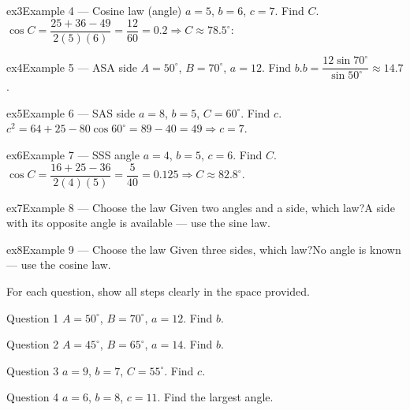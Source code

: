 \documentclass[11pt]{article}
\begin{document}
\begin{example}{ex3}{Example 4 --- Cosine law (angle)}
$a=5$, $b=6$, $c=7$. Find $C$.\soln $\cos C=\dfrac{25+36-49}{2(5)(6)}=\dfrac{12}{60}=0.2\Rightarrow C\approx78.5^\circ$:
\end{example}

\begin{example}{ex4}{Example 5 --- ASA side}
$A=50^\circ$, $B=70^\circ$, $a=12$. Find $b$.\soln $b=\dfrac{12\sin70^\circ}{\sin50^\circ}\approx14.7$.
\end{example}

\begin{example}{ex5}{Example 6 --- SAS side}
$a=8$, $b=5$, $C=60^\circ$. Find $c$.\soln $c^2=64+25-80\cos60^\circ=89-40=49\Rightarrow c=7$.
\end{example}

\begin{example}{ex6}{Example 7 --- SSS angle}
$a=4$, $b=5$, $c=6$. Find $C$.\soln $\cos C=\dfrac{16+25-36}{2(4)(5)}=\dfrac{5}{40}=0.125\Rightarrow C\approx82.8^\circ$.
\end{example}

\begin{example}{ex7}{Example 8 --- Choose the law}
Given two angles and a side, which law?\soln A side with its opposite angle is available — use the sine law.
\end{example}

\begin{example}{ex8}{Example 9 --- Choose the law}
Given three sides, which law?\soln No angle is known — use the cosine law.
\end{example}

\clearpage
{}
For each question, show all steps clearly in the space provided.

\begin{qbox}{Question 1}
$A=50^\circ$, $B=70^\circ$, $a=12$. Find $b$.\workspace{3cm}
\end{qbox}

\begin{qbox}{Question 2}
$A=45^\circ$, $B=65^\circ$, $a=14$. Find $b$.\workspace{3cm}
\end{qbox}

\begin{qbox}{Question 3}
$a=9$, $b=7$, $C=55^\circ$. Find $c$.\workspace{3cm}
\end{qbox}

\begin{qbox}{Question 4}
$a=6$, $b=8$, $c=11$. Find the largest angle.\workspace{3cm}
\end{qbox}
\end{document}

